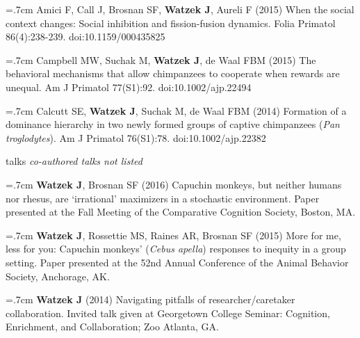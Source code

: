 \documentclass[]{friggeri-cv}
\begin{document}
\hangindent=.7cm Amici F, Call J, Brosnan SF, \textbf{Watzek J}, Aureli F (2015) When the social context changes: Social inhibition and fission-fusion dynamics. Folia Primatol 86(4):238-239. doi:10.1159/000435825

\hangindent=.7cm Campbell MW, Suchak M, \textbf{Watzek J}, de Waal FBM (2015) The behavioral mechanisms that allow chimpanzees to cooperate when rewards are unequal. Am J Primatol 77(S1):92. doi:10.1002/ajp.22494

\hangindent=.7cm Calcutt SE, \textbf{Watzek J}, Suchak M, de Waal FBM (2014) Formation of a dominance hierarchy in two newly formed groups of captive chimpanzees (\emph{Pan troglodytes}). Am J Primatol 76(S1):78. doi:10.1002/ajp.22382\\[-.1cm]


\newpage
\thispagestyle{fancy}


{\subfont\large{} talks}
% 
\hspace{.35cm} {\small{} \emph{co-authored talks not listed}} %


\hangindent=.7cm \textbf{Watzek J}, Brosnan SF (2016) Capuchin monkeys, but neither humans nor rhesus, are `irrational' maximizers in a stochastic environment. Paper presented at the Fall Meeting of the Comparative Cognition Society, Boston, MA.

\hangindent=.7cm \textbf{Watzek J}, Rossettie MS, Raines AR, Brosnan SF (2015) More for me, less for you: Capuchin monkeys' (\emph{Cebus apella}) responses to inequity in a group setting. Paper presented at the 52nd Annual Conference of the Animal Behavior Society, Anchorage, AK.

\hangindent=.7cm \textbf{Watzek J} (2014) Navigating pitfalls of researcher/caretaker collaboration. Invited talk given at Georgetown College Seminar: Cognition, Enrichment, and Collaboration; Zoo Atlanta, GA.\\[-.1cm]
\end{document}
